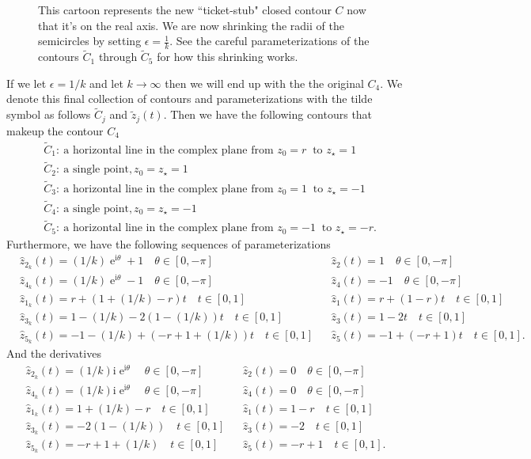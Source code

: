 \documentclass[10pt]{amsart}
\newcommand{\I}{\mathrm{i}}
\DeclareMathOperator{\E}{e}
\theoremstyle{nonumberplain}
\begin{document}
\begin{enumerate}[label={\bf {\arabic*}:}]
\begin{itemize}
\begin{figure}[h]
	\caption{
		This cartoon represents the new ``ticket-stub" closed contour $C$ now that it's on the real axis.
		We are now shrinking the radii of the semicircles by setting $\epsilon = \frac 1 k$.
		See the careful parameterizations of the contours $\widetilde C_1$ through $\widetilde C_5$ for how this shrinking works.
	}\label{fig:f4}
\end{figure}
If we let $\epsilon = 1/k$ and let $k\rightarrow \infty$ then we will end up with the the original $C_4$.
We denote this final collection of contours and parameterizations with the tilde symbol as follows $
\widetilde C_j$ and $\tilde z_j(t)$.
Then we have the following contours that makeup the contour $C_4$
\begin{align*}
&\widetilde C_1: \: \text{a horizontal line in the complex plane from } z_0=r \: \text{ to }  z_{\star}=1 \\
&\widetilde C_2: \: \text{a single point}, z_0=z_\star=1 \\
&\widetilde C_3: \: \text{a horizontal line in the complex plane from } z_0=1 \: \text{ to }  z_{\star}=-1 \\
&\widetilde C_4: \: \text{a single point}, z_0=z_\star=-1 \\
&\widetilde C_5: \: \text{a horizontal line in the complex plane from } z_0=-1 \: \text{ to }  z_{\star}=-r.
\end{align*}
Furthermore, we have the following sequences of parameterizations
\begin{align*}
&\hat z_{2_k}(t) = (1/k) \E^{\I \theta} + 1\quad \theta \in [0, -\pi]&
	&\hat z_2(t) = 1 \quad \theta \in [0, -\pi]& \\
&\hat z_{4_k}(t) = (1/k) \E^{\I \theta} - 1 \quad \theta \in [0, -\pi]&
	&\hat z_4(t) = - 1 \quad \theta \in [0, -\pi]& \\
&\hat z_{1_k}(t) = r + (1 + (1/k) - r)t  \quad t \in [0, 1]&
	&\hat z_1(t) = r + (1 - r)t \quad t \in [0, 1]& \\
&\hat z_{3_k}(t) = 1 - (1/k) - 2(1 - (1/k))t  \quad t \in [0, 1]&
	&\hat z_3(t) = 1 - 2t \quad t \in [0, 1]& \\
&\hat z_{5_k}(t) = - 1 - (1/k) + (- r + 1 + (1/k))t \quad t \in [0, 1]&
	&\hat z_5(t) = - 1 + (- r + 1)t \quad t \in [0, 1].&
\end{align*}
And the derivatives
\begin{align*}
&\hat z_{2_k}(t) = (1/k)\I \E^{\I \theta} \quad \theta \in [0, -\pi]&
	&\hat z_2(t) = 0 \quad \theta \in [0, -\pi]& \\
&\hat z_{4_k}(t) = (1/k)\I \E^{\I \theta} \quad \theta \in [0, -\pi]&
	&\hat z_4(t) = 0 \quad \theta \in [0, -\pi]& \\
&\hat z_{1_k}(t) = 1 + (1/k) - r  \quad t \in [0, 1]&
	&\hat z_1(t) = 1 - r \quad t \in [0, 1]& \\
&\hat z_{3_k}(t) = - 2(1 - (1/k))  \quad t \in [0, 1]&
	&\hat z_3(t) = - 2 \quad t \in [0, 1]& \\
&\hat z_{5_k}(t) = - r + 1 + (1/k) \quad t \in [0, 1]&
	&\hat z_5(t) = - r + 1 \quad t \in [0, 1].&
\end{align*}
\\


\end{itemize}
\end{enumerate}
\end{document}
